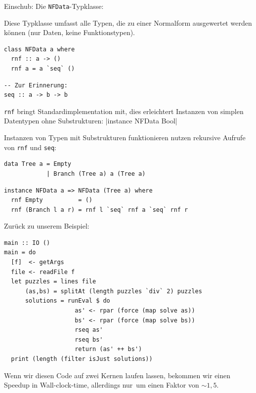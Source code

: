 \documentclass{beamer}
\begin{document}
\begin{frame}[fragile]
Einschub: Die \texttt{NFData}-Typklasse:\smallskip

Diese Typklasse umfasst alle Typen, die zu einer Normalform ausgewertet werden können (nur Daten, keine Funktionstypen).
\pause

\begin{multicols}{2}
\begin{verbatim}
class NFData a where
  rnf :: a -> ()
  rnf a = a `seq` ()
\end{verbatim}
\columnbreak
\pause

\begin{verbatim}
-- Zur Erinnerung:
seq :: a -> b -> b
\end{verbatim}
\pause
\end{multicols}

\texttt{rnf} bringt Standardimplementation mit, dies erleichtert Instanzen von simplen Datentypen ohne Substrukturen:
|instance NFData Bool|
\pause

Instanzen von Typen mit Substrukturen funktionieren nutzen rekursive Aufrufe von \texttt{rnf} und \texttt{seq}:

\begin{verbatim}
data Tree a = Empty
            | Branch (Tree a) a (Tree a)
\end{verbatim}

\begin{verbatim}
instance NFData a => NFData (Tree a) where
  rnf Empty          = ()
  rnf (Branch l a r) = rnf l `seq` rnf a `seq` rnf r
\end{verbatim}

\end{frame}


\begin{frame}[fragile]
Zurück zu unserem Beispiel:

\begin{verbatim}
main :: IO ()
main = do
  [f]  <- getArgs
  file <- readFile f
  let puzzles = lines file
      (as,bs) = splitAt (length puzzles `div` 2) puzzles
      solutions = runEval $ do
                    as' <- rpar (force (map solve as))
                    bs' <- rpar (force (map solve bs))
                    rseq as'
                    rseq bs'
                    return (as' ++ bs')
  print (length (filter isJust solutions))
\end{verbatim}
\pause

Wenn wir diesen Code auf zwei Kernen laufen lassen, bekommen wir einen Speedup in Wall-clock-time, allerdings \glqq nur\grqq\ um einen Faktor von $\sim 1,5$.
\end{frame}
\end{document}
